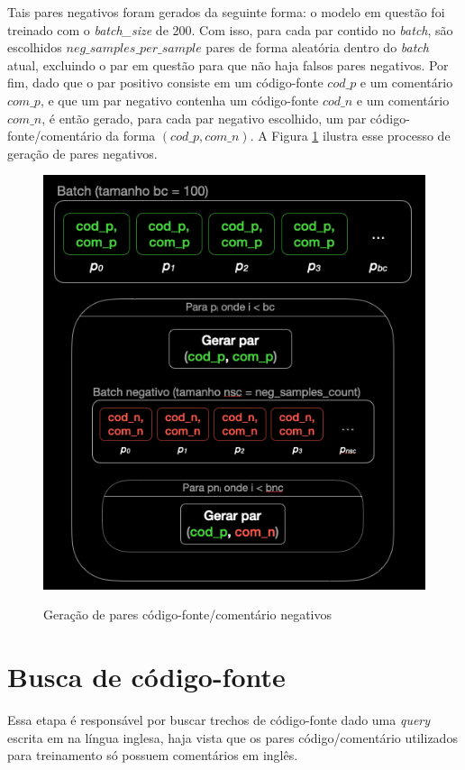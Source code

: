 Tais pares negativos foram gerados da seguinte forma: o modelo em questão foi treinado com o \textit{batch\_size} de 200. Com isso, para cada par contido no \textit{batch}, são escolhidos $neg\_samples\_per\_sample$ pares de forma aleatória dentro do \textit{batch} atual, excluindo o par em questão para que não haja falsos pares negativos. Por fim, dado que o par positivo consiste em um código-fonte $cod\_p$ e um comentário $com\_p$, e que um par negativo contenha um código-fonte $cod\_n$ e um comentário $com\_n$, é então gerado, para cada par negativo escolhido, um par código-fonte/comentário da forma $(cod\_p, com\_n)$. A Figura \ref{fig:metodology-neg_samples_gen_diagram} ilustra esse processo de geração de pares negativos.

\begin{figure}[H]
    \centering
        \caption{Geração de pares código-fonte/comentário negativos}
        \includegraphics[scale=0.6]{neg_samples_gen.png}
        \label{fig:metodology-neg_samples_gen_diagram}
\end{figure}

\section{Busca de código-fonte}
Essa etapa é responsável por buscar trechos de código-fonte dado uma \textit{query} escrita em na língua inglesa, haja vista que os pares código/comentário utilizados para treinamento só possuem comentários em inglês.

